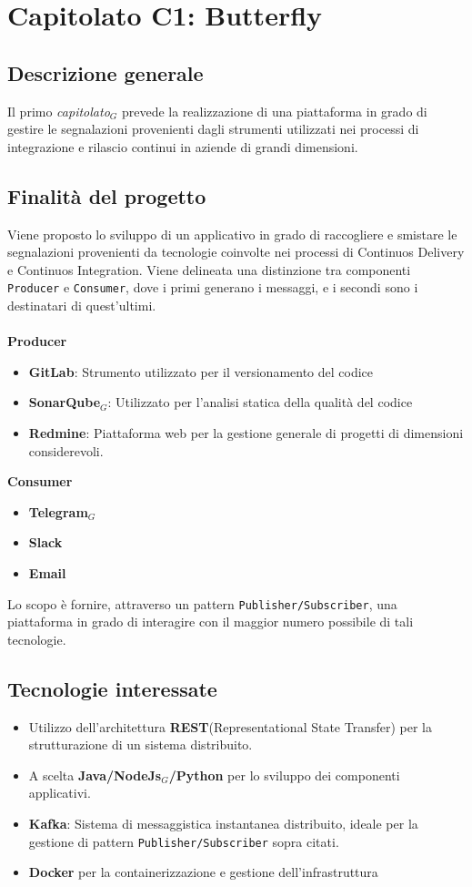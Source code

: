 \chapter{Capitolato C1: Butterfly}
\section{Descrizione generale}
Il primo \textit{capitolato$_{G}$} prevede la realizzazione di una piattaforma in grado di gestire le segnalazioni provenienti dagli strumenti utilizzati nei processi di integrazione e rilascio continui in aziende di grandi dimensioni. 

\section{Finalit\`a del progetto}
Viene proposto lo sviluppo di un applicativo in grado di raccogliere e smistare le segnalazioni provenienti da tecnologie coinvolte nei processi di Continuos Delivery e Continuos Integration.
Viene delineata una distinzione tra componenti \texttt{Producer} e \texttt{Consumer}, dove i primi generano i messaggi, e i secondi sono i destinatari di quest'ultimi.\\
\\
\textbf{Producer}
	\begin{itemize}
	\item \textbf{GitLab}: Strumento utilizzato per il versionamento del codice
	\item \textbf{SonarQube$_{G}$}: Utilizzato per l'analisi statica della qualità del codice
	\item \textbf{Redmine}: Piattaforma web per la gestione generale di progetti di dimensioni considerevoli.
	\end{itemize}
\textbf{Consumer}
	\begin{itemize}	
		\item \textbf{Telegram$_{G}$}
		\item \textbf{Slack}
		\item \textbf{Email}
	\end{itemize}

Lo scopo è fornire, attraverso un pattern \texttt{Publisher/Subscriber}, una piattaforma in grado di interagire con il maggior numero possibile di tali tecnologie. 	
	
	
\section{Tecnologie interessate}
	\begin{itemize}
		\item Utilizzo dell'architettura \textbf{REST}(Representational State Transfer) per la strutturazione di un sistema distribuito.
		\item A scelta \textbf{Java/NodeJs$_{G}$/Python} per lo sviluppo dei componenti applicativi.
		\item \textbf{Kafka}: Sistema di messaggistica instantanea distribuito, ideale per la gestione di pattern \texttt{Publisher/Subscriber} sopra citati. 
		\item \textbf{Docker} per la containerizzazione e gestione dell'infrastruttura
	\end{itemize}

